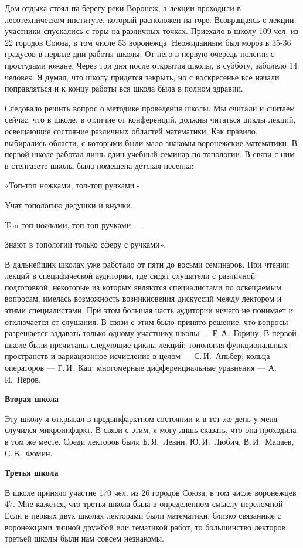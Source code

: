 Дом отдыха стоял па берегу реки Воронеж, а лекции проходили в лесотехническом институте, который расположен на горе. Возвращаясь с лекции, участники спускались с горы на различных точках. Приехало в школу 109 чел. из 22 городов Союза, в том числе 53 воронежца. Неожиданным был мороз в 35-36 градусов в первые дни работы школы. От него в первую очередь полегли с простудами южане. Через три дня после открытия школы, в субботу, заболело 14 человек. Я думал, что школу придется закрыть, но с воскресенье все начали поправляться и к концу работы вся школа была в полном здравии.

Следовало решить вопрос о методике проведения школы. Мы считали и считаем сейчас, что в школе, в отличие от конференций, должны читаться циклы лекций, освещающие состояние различных областей математики. Как правило, выбирались области, с которыми были мало знакомы воронежские математики.
В первой школе работал лишь один учебный семинар по топологии. В связи с ним в стенгазете школы была помещена детская песенка:

«Топ-топ ножками, топ-топ ручками -

Учат топологию дедушки и внучки.

Ton-топ ножками, топ-топ ручками —

Знают в топологии только сферу с ручками».

В дальнейших школах уже работало от пяти до восьми семинаров. При чтении лекций в специфической аудитории, где сидят слушатели с различной подготовкой, некоторые из которых являются специалистами по освещаемым вопросам, имелась возможность возникновения дискуссий между лектором и этими специалистами. При этом большая часть аудитории ничего не понимает и отключается от слушания. В связи с этим было принято решение, что вопросы разрешается задавать только одному участнику школы --- Е.\,А.~Горину.
В первой школе были прочитаны следующие циклы лекций: топология функциональных пространств и вариационное исчисление в целом --- С.\,И.~Апьбер; кольца операторов --- Г.\,И.~Кац: многомерные дифференциальные уравнения --- А.\,И.~Перов.

{\bf Вторая школа}

Эту школу я открывал в предынфарктном состоянии и в тот же день у меня случился микроинфаркт.
В связи с этим, я могу лишь сказать, что она проходила в том же месте. Среди лекторов были Б.\,Я.~Левин, Ю.\,И.~Любич, В.\,И.~Мацаев, С.\,В.~Фомин.

{\bf Третья школа}

В школе приняло участие 170 чел. из 26 городов Союза, в том числе воронежцев 47. Мне кажется, что третья школа была в определенном смыслу переломной. Если в первых двух школах лекторами были математики, близко связанные с воронежцами личной дружбой или тематикой работ, то большинство лекторов третьей школы были нам совсем незнакомы.

